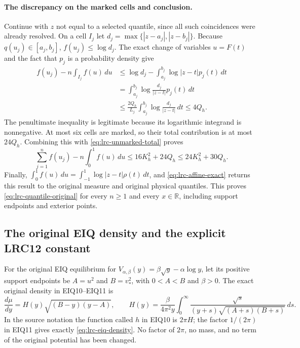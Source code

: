 \documentclass[11pt,a4paper]{article}
\begin{document}
\paragraph{The discrepancy on the marked cells and conclusion.}
Continue with $z$ not equal to a selected quantile, since all such
coincidences were already resolved. On a cell $I_j$ let
$d_j=\max\{|z-a_j|,|z-b_j|\}$. Because $q(u_j)\in[a_j,b_j]$,
$f(u_j)\leq\log d_j$. The exact change of variables $u=F(t)$ and
the fact that $p_j$ is a probability density give
\[
 \begin{split}
 f(u_j)-n\int_{I_j}f(u)\,du
 &\leq\log d_j-\int_{a_j}^{b_j}\log|z-t|p_j(t)\,dt\\
 &=\int_{a_j}^{b_j}\log\frac{d_j}{|z-t|}p_j(t)\,dt\\
 &\leq\frac{2Q_h}{L_j}
             \int_{a_j}^{b_j}\log\frac{d_j}{|z-t|}\,dt
 \leq4Q_h.
 \end{split}
\]
The penultimate inequality is legitimate because its logarithmic
integrand is nonnegative. At most six cells are marked, so their
total contribution is at most $24Q_h$. Combining this with
\eqref{eq:lrc-unmarked-total} proves
\[
 \sum_{j=1}^nf(u_j)-n\int_0^1f(u)\,du
 \leq16K_h^2+24Q_h\leq24K_h^2+30Q_h.
\]
Finally,
$\int_0^1f(u)\,du=\int_{-1}^1\log|z-t|\rho(t)\,dt$,
and \eqref{eq:lrc-affine-exact} returns this result to the original
measure and original physical quantiles. This proves
\eqref{eq:lrc-quantile-original} for every $n\geq1$ and every
$x\in\mathbb R$, including support endpoints and exterior points.

\subsection{The original EIQ density and the explicit LRC12 constant}

For the original EIQ equilibrium for
$V_{\alpha,\beta}(y)=\beta\sqrt y-\alpha\log y$, let its positive
support endpoints be $A=u^2$ and $B=v_*^2$, with $0<A<B$ and
$\beta>0$. The exact original density in EIQ10--EIQ11 is
\begin{equation}\label{eq:lrc-eiq-density}
 \frac{d\mu}{dy}=H(y)\sqrt{(B-y)(y-A)},\qquad
 H(y)=\frac{\beta}{4\pi^2y}
       \int_0^\infty
       \frac{\sqrt s}{(y+s)\sqrt{(A+s)(B+s)}}\,ds.
\end{equation}
In the source notation the function called $h$ in EIQ10 is
$2\pi H$; the factor $1/(2\pi)$ in EIQ11 gives exactly
\eqref{eq:lrc-eiq-density}. No factor of $2\pi$, no mass, and no
term of the original potential has been changed.
\end{document}
